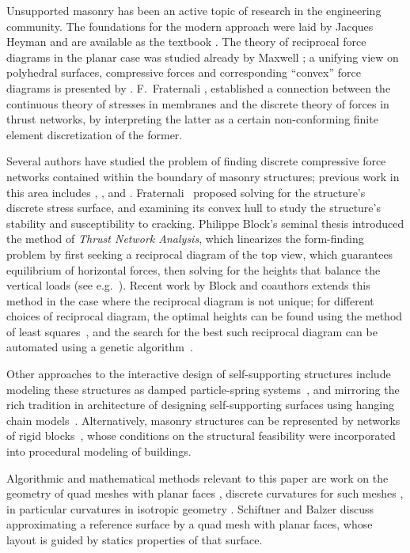 \documentclass[review]{acmsiggraph}
\begin{document}
Unsupported masonry has been an active topic of research in the 
engineering community. The foundations for the modern approach were laid 
by Jacques Heyman  and are available as the textbook 
\cite{Heyman95}. The theory of reciprocal force diagrams in the planar
case was studied already by Maxwell \cite{Maxwell64};
a unifying view on polyhedral surfaces, compressive 
forces and corresponding ``convex'' force diagrams is presented by 
\cite{Ash1988}. F.~Fraternali , 
 established a connection between the continuous 
theory of stresses in membranes and the discrete theory of forces in 
thrust networks, by interpreting the latter as a certain non-conforming 
finite element discretization of the former.

Several authors have studied the problem of finding discrete compressive 
force networks contained within the boundary of masonry structures; previous
work in this area includes \cite{Livesley92}, \cite{O'Dwyer98}, and
\cite{andreu-2007}. Fraternali~ proposed solving 
for the structure's discrete stress surface, and examining its convex hull 
to study the structure's stability and susceptibility to cracking. 
Philippe Block's seminal thesis introduced the method of {\it Thrust 
Network Analysis}, which linearizes the form-finding problem by first 
seeking a reciprocal diagram of the top view, which guarantees equilibrium 
of horizontal forces, then solving for the heights that balance the 
vertical loads (see e.g.\ \cite{Block07,block09}). Recent work by Block 
and coauthors extends this method in the case where the reciprocal diagram 
is not unique; for different choices of reciprocal diagram, the optimal 
heights can be found using the method of least squares~\cite{vanmele2011}, 
and the search for the best such reciprocal diagram can be automated using 
a genetic algorithm~\cite{Block2011}.

Other approaches to the interactive design of self-supporting structures 
include modeling these structures as damped particle-spring 
systems~\cite{Kilian2005,barnes09}, and mirroring the rich tradition in 
architecture of designing self-supporting surfaces using hanging chain 
models~\cite{Heyman98}. Alternatively, masonry structures can be 
represented by networks of rigid blocks~\cite{Whiting09}, whose conditions 
on the structural feasibility were incorporated into procedural modeling 
of buildings.

Algorithmic and mathematical methods relevant to this paper are work on 
the geometry of quad meshes with planar faces \cite{Glymph2004,Liu2006}, 
discrete curvatures for such meshes \cite{Pottmann2007b,bobenko-2010-ct}, 
in particular curvatures in isotropic geometry \cite{Pottmann2007}. 
Schiftner and Balzer  discuss approximating a 
reference surface by a quad mesh with planar faces, whose layout is guided 
by statics properties of that surface.
\end{document}
